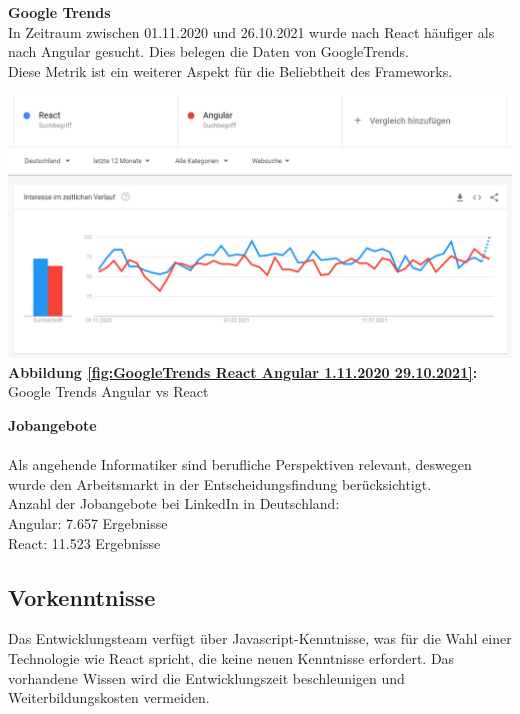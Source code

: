 
\begin{flushleft}
  \textbf{Google Trends}\\
  In Zeitraum zwischen 01.11.2020 und 26.10.2021 wurde nach React häufiger als nach Angular gesucht. Dies belegen die Daten von GoogleTrends.
  \\
  Diese Metrik ist ein weiterer Aspekt für die Beliebtheit des Frameworks.
\end{flushleft}

\begin{center}
  \includegraphics[scale=0.5]
  {sources/GoogleTrends React Angular 1.11.2020 29.10.2021}\label{fig:GoogleTrends React Angular 1.11.2020 29.10.2021}\\
  \textbf{Abbildung \autoref{fig:GoogleTrends React Angular 1.11.2020 29.10.2021}:} Google Trends Angular vs React
    {\cite{GO01}}
\end{center}


  \textbf{Jobangebote}\\
  \paragraph{}
  Als angehende Informatiker sind berufliche Perspektiven relevant, deswegen wurde den Arbeitsmarkt in der Entscheidungsfindung berücksichtigt.
  \\
  Anzahl der Jobangebote bei LinkedIn in Deutschland:
  \\
  Angular: 7.657 Ergebnisse{\cite{LI1}}
  \\
  React: 11.523 Ergebnisse{\cite{LI2}}

\subsection{Vorkenntnisse}
Das Entwicklungsteam verfügt über Javascript-Kenntnisse, was für die Wahl einer Technologie wie React spricht, die keine neuen Kenntnisse erfordert. Das vorhandene Wissen wird die Entwicklungszeit beschleunigen und Weiterbildungskosten vermeiden.

